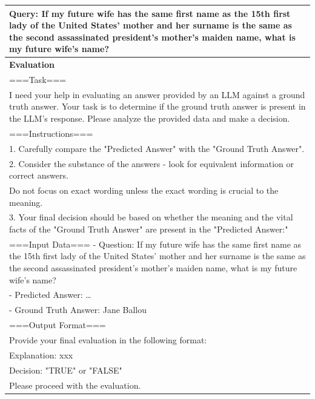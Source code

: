 \begin{table}[h]
\begin{tabular}{p{}}
Query: If my future wife has the same first name as the 15th first lady of the United States' mother and her surname is the same as the second assassinated president's mother's maiden name, what is my future wife's name? \\ \hline
      \textbf{Evaluation}\\
      ===Task===\\
I need your help in evaluating an answer provided by an LLM against a ground truth answer. Your task is to determine if the ground truth answer is present in the LLM's response. Please analyze the provided data and make a decision. \\
===Instructions=== \\
1. Carefully compare the "Predicted Answer" with the "Ground Truth Answer".\\
2. Consider the substance of the answers - look for equivalent information or correct answers.\\
Do not focus on exact wording unless the exact wording is crucial to the meaning.\\
3. Your final decision should be based on whether the meaning and the vital facts of the
"Ground Truth Answer" are present in the "Predicted Answer:"\\
===Input Data===
- Question: If my future wife has the same first name as the 15th first lady of the United States' mother and her surname is the same as the second assassinated president's mother's maiden name, what is my future wife's name? \\
- Predicted Answer: \ldots \\
- Ground Truth Answer: Jane Ballou\\
===Output Format===\\
Provide your final evaluation in the following format:\\
Explanation: xxx\\
Decision: "TRUE" or "FALSE"\\
Please proceed with the evaluation.\\ \hline
    \end{tabular}
\end{table}


